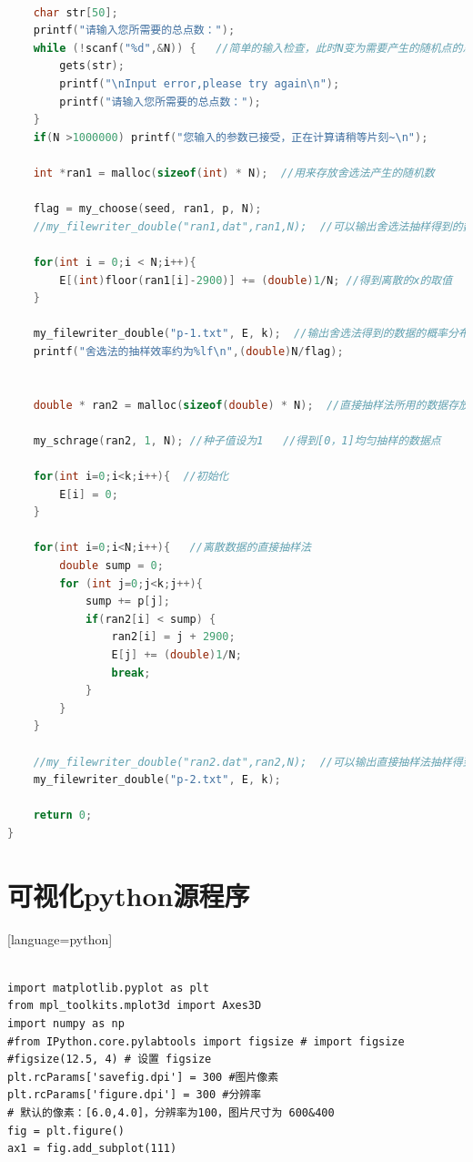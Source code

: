 \documentclass[a4paper,11pt]{article}
\begin{document}
\begin{appendices}
\begin{lstlisting}[language = C]
    
    char str[50];
    printf("请输入您所需要的总点数：");
    while (!scanf("%d",&N)) {   //简单的输入检查，此时N变为需要产生的随机点的总数
        gets(str);
        printf("\nInput error,please try again\n");
        printf("请输入您所需要的总点数：");
    }
    if(N >1000000) printf("您输入的参数已接受，正在计算请稍等片刻~\n");

    int *ran1 = malloc(sizeof(int) * N);  //用来存放舍选法产生的随机数
   
    flag = my_choose(seed, ran1, p, N);
    //my_filewriter_double("ran1,dat",ran1,N);  //可以输出舍选法抽样得到的数据，此处只计算得到数据的概率分布，故输出略去。
    
    for(int i = 0;i < N;i++){
        E[(int)floor(ran1[i]-2900)] += (double)1/N; //得到离散的x的取值
    }
    
    my_filewriter_double("p-1.txt", E, k);  //输出舍选法得到的数据的概率分布至文件
    printf("舍选法的抽样效率约为%lf\n",(double)N/flag);
    
    
    double * ran2 = malloc(sizeof(double) * N);  //直接抽样法所用的数据存放数组
    
    my_schrage(ran2, 1, N); //种子值设为1   //得到[0，1]均匀抽样的数据点
    
    for(int i=0;i<k;i++){  //初始化
        E[i] = 0;
    }
    
    for(int i=0;i<N;i++){   //离散数据的直接抽样法
        double sump = 0;
        for (int j=0;j<k;j++){
            sump += p[j];
            if(ran2[i] < sump) {
                ran2[i] = j + 2900;
                E[j] += (double)1/N;
                break;
            }
        }
    }
    
    //my_filewriter_double("ran2.dat",ran2,N);  //可以输出直接抽样法抽样得到的数据，此处只计算得到数据的概率分布，故输出略去。
    my_filewriter_double("p-2.txt", E, k);
    
    return 0;
}
\end{lstlisting}

\section{可视化python源程序}[language=python]

\begin{lstlisting}
	
import matplotlib.pyplot as plt
from mpl_toolkits.mplot3d import Axes3D
import numpy as np
#from IPython.core.pylabtools import figsize # import figsize
#figsize(12.5, 4) # 设置 figsize
plt.rcParams['savefig.dpi'] = 300 #图片像素
plt.rcParams['figure.dpi'] = 300 #分辨率
# 默认的像素：[6.0,4.0]，分辨率为100，图片尺寸为 600&400
fig = plt.figure()
ax1 = fig.add_subplot(111)


\end{lstlisting}
\end{appendices}
\end{document}
